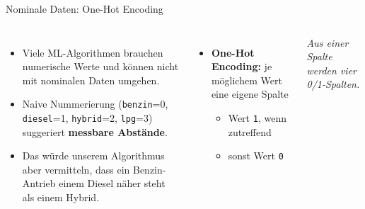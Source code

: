\begin{frame}{Nominale Daten: One-Hot Encoding}
\begin{columns}
\begin{itemize}
  \item Viele ML-Algorithmen brauchen numerische Werte und können nicht mit nominalen Daten umgehen.
  \item Naive Nummerierung
        (\texttt{benzin}=0, \texttt{diesel}=1, \texttt{hybrid}=2, \texttt{lpg}=3)
        suggeriert \textbf{messbare Abstände}.
  \item Das würde unserem Algorithmus aber vermitteln, dass ein Benzin-Antrieb einem Diesel näher steht als einem Hybrid.
  
\end{itemize}

\begin{itemize}
  \item \textbf{One-Hot Encoding:} je möglichem Wert eine eigene Spalte
        \begin{itemize}
          \item Wert \texttt{1}, wenn zutreffend
          \item sonst Wert \texttt{0}
        \end{itemize}
\end{itemize}

\medskip
\centering
\renewcommand{\arraystretch}{1.5}

\vspace{0.6em}
{\footnotesize\itshape Aus einer Spalte werden vier 0/1-Spalten.}
\end{columns}
\end{frame}

